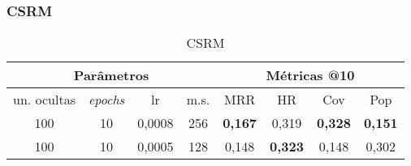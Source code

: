 \subsubsection{CSRM}

\begin{table}[htbp]
  \centering
  \begin{tabular}{|c|c|c|c|c|c|c|c|}
    \hline
      \multicolumn{4}{|c|}{Parâmetros} & \multicolumn{4}{c|}{Métricas @10} \\
      \hline
      un. ocultas & \textit{epochs}  & lr  & m.s. & MRR & HR & Cov & Pop \\
      \hline
      100  & 10 & 0,0008 & 256 & \textbf{0,167} & 0,319 & \textbf{0,328} & \textbf{0,151} \\
      \hline
      100  & 10 & 0,0005 & 128 & 0,148 & \textbf{0,323} & 0,148 & 0,302 \\
      \hline
    \end{tabular}
    \caption{CSRM}
\end{table}

\newpage




